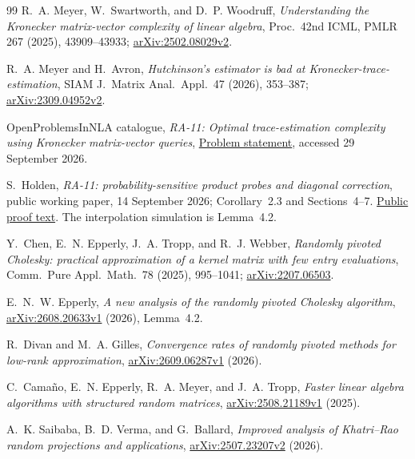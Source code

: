 \documentclass[11pt,a4paper]{article}
\theoremstyle{definition}\newtheorem{definition}[theorem]{Definition}
\theoremstyle{remark}\newtheorem{remark}[theorem]{Remark}
\numberwithin{equation}{section}
\begin{document}
\begin{thebibliography}{99}
R.~A. Meyer, W.~Swartworth, and D.~P. Woodruff,
\emph{Understanding the Kronecker matrix-vector complexity of linear algebra},
Proc.\ 42nd ICML, PMLR 267 (2025), 43909--43933; \href{https://arxiv.org/abs/2502.08029v2}{arXiv:2502.08029v2}.

R.~A. Meyer and H.~Avron,
\emph{Hutchinson's estimator is bad at Kronecker-trace-estimation},
SIAM J.\ Matrix Anal.\ Appl.\ 47 (2026), 353--387; \href{https://arxiv.org/abs/2309.04952v2}{arXiv:2309.04952v2}.

OpenProblemsInNLA catalogue,
\emph{RA-11: Optimal trace-estimation complexity using Kronecker matrix-vector queries},
\href{https://github.com/ajt60gaibb/OpenProblemsInNLA/blob/main/randomized-and-low-rank-approximation/RA-11/README.md}{Problem statement}, accessed 29 September 2026.

S.~Holden,
\emph{RA-11: probability-sensitive product probes and diagonal correction},
public working paper, 14 September 2026; Corollary~2.3 and Sections~4--7.
\href{https://github.com/ajt60gaibb/OpenProblemsInNLA/blob/main/references/holden-further-2026-09-14/RA-11/manuscript.md}{Public proof text}.
The interpolation simulation is Lemma~4.2.

Y.~Chen, E.~N. Epperly, J.~A. Tropp, and R.~J. Webber,
\emph{Randomly pivoted Cholesky: practical approximation of a kernel matrix with
few entry evaluations}, Comm.\ Pure Appl.\ Math.\ 78 (2025), 995--1041; \href{https://arxiv.org/abs/2207.06503}{arXiv:2207.06503}.

E.~N.~W. Epperly,
\emph{A new analysis of the randomly pivoted Cholesky algorithm},
\href{https://arxiv.org/html/2608.20633v1}{arXiv:2608.20633v1} (2026), Lemma~4.2.

R.~Divan and M.~A. Gilles,
\emph{Convergence rates of randomly pivoted methods for low-rank approximation},
\href{https://arxiv.org/html/2609.06287v1}{arXiv:2609.06287v1} (2026).

C.~Cama\~no, E.~N. Epperly, R.~A. Meyer, and J.~A. Tropp,
\emph{Faster linear algebra algorithms with structured random matrices},
\href{https://arxiv.org/abs/2508.21189v1}{arXiv:2508.21189v1} (2025).

A.~K. Saibaba, B.~D. Verma, and G.~Ballard,
\emph{Improved analysis of Khatri--Rao random projections and applications},
\href{https://arxiv.org/abs/2507.23207v2}{arXiv:2507.23207v2} (2026).


\end{thebibliography}
\end{document}
